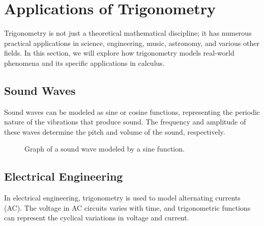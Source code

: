\documentclass[a4paper,12pt]{book}
\begin{document}


\section{Applications of Trigonometry}
\label{sec:applications_trigonometry}

Trigonometry is not just a theoretical mathematical discipline; it has numerous practical applications in science, engineering, music, astronomy, and various other fields. In this section, we will explore how trigonometry models real-world phenomena and its specific applications in calculus.

\subsection{Sound Waves}
\label{subsec:sound_waves}
Sound waves can be modeled as sine or cosine functions, representing the periodic nature of the vibrations that produce sound. The frequency and amplitude of these waves determine the pitch and volume of the sound, respectively.

\begin{figure}[h]
\centering
{}
\caption{Graph of a sound wave modeled by a sine function.}
\label{fig:sound_wave}
\end{figure}

\subsection{Electrical Engineering}
\label{subsec:electrical_engineering}
In electrical engineering, trigonometry is used to model alternating currents (AC). The voltage in AC circuits varies with time, and trigonometric functions can represent the cyclical variations in voltage and current.
\end{document}
